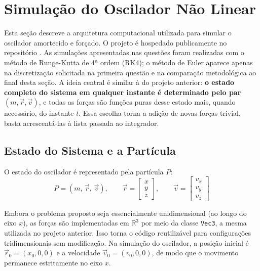 \section{Simulação do Oscilador Não Linear}
\label{sec:simulacao}

Esta seção descreve a arquitetura computacional utilizada para simular o oscilador amortecido e forçado. O projeto é hospedado publicamente no repositório \cite{mecanica-geral-repo-2026}. As simulações apresentadas nas questões foram realizadas com o método de Runge-Kutta de 4ª ordem (RK4); o método de Euler aparece apenas na discretização solicitada na primeira questão e na comparação metodológica ao final desta seção. A ideia central é similar à do projeto anterior: \textbf{o estado completo do sistema em qualquer instante é determinado pelo par $(m, \vec{r}, \vec{v})$}, e todas as forças são funções puras desse estado mais, quando necessário, do instante $t$. Essa escolha torna a adição de novas forças trivial, basta acrescentá-las à lista passada ao integrador.

\subsection{Estado do Sistema e a Partícula}

O estado do oscilador é representado pela partícula $P$:
\begin{equation}
    P = (m,\,\vec{r},\,\vec{v}), \qquad
    \vec{r} = \begin{bmatrix}x\\y\\z\end{bmatrix}, \qquad
    \vec{v} = \begin{bmatrix}v_x\\v_y\\v_z\end{bmatrix}
\end{equation}

Embora o problema proposto seja essencialmente unidimensional (ao longo do eixo $x$), as forças são implementadas em $\mathbb{R}^3$ por meio da classe \texttt{Vec3}, a mesma utilizada no projeto anterior. Isso torna o código reutilizável para configurações tridimensionais sem modificação. Na simulação do oscilador, a posição inicial é $\vec{r}_0 = (x_0, 0, 0)$ e a velocidade $\vec{v}_0 = (v_0, 0, 0)$, de modo que o movimento permanece estritamente no eixo $x$.


